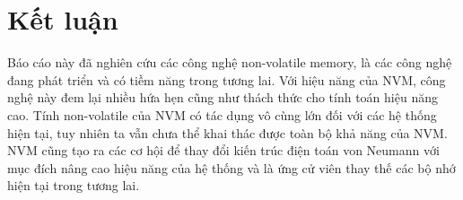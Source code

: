 \section{Kết luận}
Báo cáo này đã nghiên cứu các công nghệ non-volatile memory, là các công nghệ
đang phát triển và có tiềm năng trong tương lai. Với hiệu năng của NVM, công
nghệ này đem lại nhiều hứa hẹn cũng như thách thức cho tính toán hiệu năng cao.
Tính non-volatile của NVM có tác dụng vô cùng lớn đối với các hệ thống hiện tại,
tuy nhiên ta vẫn chưa thể khai thác được toàn bộ khả năng của NVM. NVM cũng tạo
ra các cơ hội để thay đổi kiến trúc điện toán von Neumann với mục đích nâng cao
hiệu năng của hệ thống và là ứng cử viên thay thế các bộ nhớ hiện tại trong
tương lai.